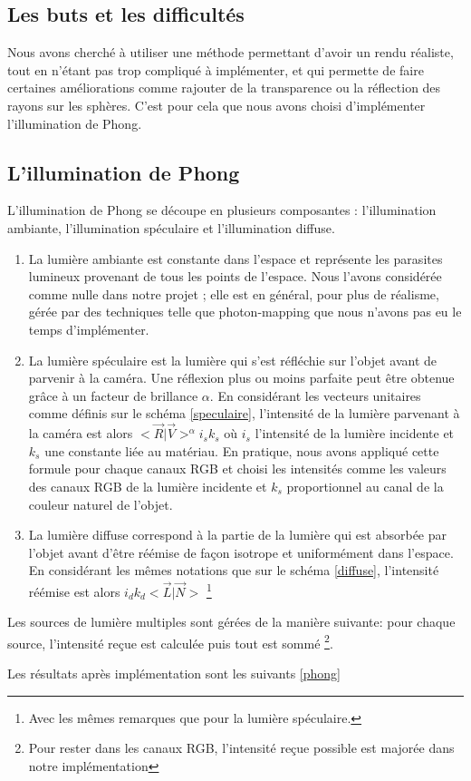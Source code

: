 \subsection{Les buts et les difficultés}
Nous avons cherché à utiliser une méthode permettant d'avoir un rendu réaliste, tout en n'étant pas trop compliqué à implémenter, et qui permette de faire certaines améliorations comme rajouter de la transparence ou la réflection des rayons sur les sphères. C'est pour cela que nous avons choisi d'implémenter l'illumination de Phong.

\subsection{L'illumination de Phong}

L'illumination de Phong se découpe en plusieurs composantes : l'illumination ambiante, l'illumination spéculaire et l'illumination diffuse.
\begin{enumerate}
\item La lumière ambiante est constante dans l'espace et représente les parasites lumineux provenant de tous les points de l'espace. Nous l'avons considérée comme nulle dans notre projet ; elle est en général, pour plus de réalisme, gérée par des techniques telle que photon-mapping que nous n'avons pas eu le temps d'implémenter.
\item La lumière spéculaire est la lumière qui s'est réfléchie sur l'objet avant de parvenir à la caméra. Une réflexion plus ou moins parfaite peut être obtenue grâce à un facteur de brillance $\alpha$. En considérant les vecteurs unitaires comme définis sur le schéma \ref{speculaire}, l'intensité de la lumière parvenant à la caméra est alors $<\vec{R}|\vec{V}>^{\alpha} i_{s} k_{s}$ où $i_{s}$ l'intensité de la lumière incidente et $k_{s}$ une constante liée au matériau. En pratique, nous avons appliqué cette formule pour chaque canaux RGB et choisi les intensités comme les valeurs des canaux RGB de la lumière incidente et $k_{s}$ proportionnel au canal de la couleur naturel de l'objet.
\item La lumière diffuse correspond à la partie de la lumière qui est absorbée par l'objet avant d'être réémise de façon isotrope et uniformément dans l'espace. En considérant les mêmes notations que sur le schéma \ref{diffuse}, l'intensité réémise est alors $i_{d}k_{d}<\vec{L}|\vec{N}>$ \footnote{Avec les mêmes remarques que pour la lumière spéculaire.}
\end{enumerate}

Les sources de lumière multiples sont gérées de la manière suivante: pour chaque source, l'intensité reçue est calculée puis tout est sommé \footnote{Pour rester dans les canaux RGB, l'intensité reçue possible est majorée dans notre implémentation}.

Les résultats après implémentation sont les suivants \ref{phong}